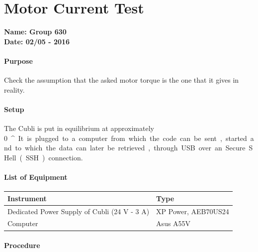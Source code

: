 \chapter{Motor Current Test} \label{app:motorCurrentTest}
\textbf{Name: Group 630}\\
\textbf{Date: 02/05 - 2016}

\subsubsection{Purpose}
Check the assumption that the asked motor torque is the one that it gives in reality.

\subsubsection{Setup}
The Cubli is put in equilibrium at approximately \SI{0}{^{\circ}}. 
It is plugged to a computer from which the code can be sent, started and to which the data can later be retrieved, through USB over an Secure SHell (SSH) connection.

\subsubsection{List of Equipment}
\begin{table}[H]
	\centering
\begin{tabular}{|p{10cm}|p{4cm}|}
\hline%
  \textbf{Instrument}                &  \textbf{Type} \\
\hline%
  Dedicated Power Supply of Cubli \small{(24 V - 3 A)} & XP Power, AEB70US24 \\
\hline%
  Computer                           &  Asus A55V  \\
\hline%

\end{tabular}
\end{table}

\subsubsection{Procedure}


